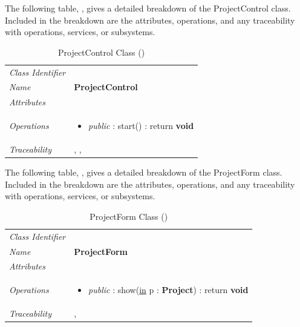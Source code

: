 \documentclass[12pt,letterpaper]{article}
\begin{document}
The following table, , gives a detailed breakdown of the ProjectControl class. Included in the breakdown are the attributes, operations, and any traceability with operations, services, or subsystems.

\begin{table}[H]
    \caption{ProjectControl Class ()} 
	\begin{tabu} to 
		\toprule
		Class Identifier &  \\
		Name & {\bf ProjectControl} \\
		Attributes & \\

		Operations &
		\begin{minipage}[t]{\linewidth}
			\begin{itemize}
			    \item {\it public} : start() : return {\bf void}
	        \end{itemize}
	    \end{minipage} \\
	    	Traceability & , , \\
		\toprule
	\end{tabu}
\end{table}

The following table, , gives a detailed breakdown of the ProjectForm class. Included in the breakdown are the attributes, operations, and any traceability with operations, services, or subsystems.

\begin{table}[H]
    \caption{ProjectForm Class ()} 
	\begin{tabu} to 
		\toprule
		Class Identifier &  \\
		Name & {\bf ProjectForm} \\
		Attributes & \\

		Operations &
		\begin{minipage}[t]{\linewidth}
			\begin{itemize}
			    \item {\it public} : show(\underline{in} p : {\bf Project}) : return {\bf void}
	        \end{itemize}
	    \end{minipage} \\
	    	Traceability & , \\
		\toprule
	\end{tabu}
\end{table}
\end{document}
